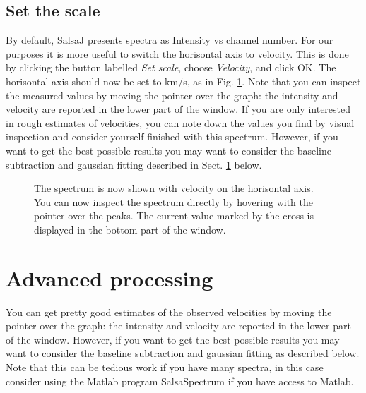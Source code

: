 \documentclass[11pt,a4paper]{article}
\begin{document}
\subsection{Set the scale}
By default, SalsaJ presents spectra as Intensity vs channel number. For our
purposes it is more useful to switch the horisontal axis to velocity. This is
done by clicking the button labelled \emph{Set scale}, choose \emph{Velocity},
and click OK. The horisontal axis should now be set to km/s, as in Fig.
\ref{fig:velocity}. Note that you can inspect the measured values by moving the
pointer over the graph: the intensity and velocity are reported in the lower part
of the window. If you are only interested in rough estimates of velocities,
you can note down the values you find by visual inspection and consider yourself finished
with this spectrum. However, if you want to get the best possible results you may 
want to consider the baseline subtraction and gaussian fitting described in Sect. 
\ref{sect:adv} below.
\begin{figure}[h!]
  \centering
  \caption{The spectrum is now shown with velocity on the horisontal axis. You can now
  inspect the spectrum directly by hovering with the pointer over the peaks. The current value
  marked by the cross is displayed in the bottom part of the window.}
  \label{fig:velocity}
\end{figure}

\section{Advanced processing}
\label{sect:adv}
You can get pretty good estimates of the observed velocities by moving the
pointer over the graph: the intensity and velocity are reported in the lower
part of the window.  However, if you want to get the best possible results you
may want to consider the baseline subtraction and gaussian fitting as described
below.  Note that this can be tedious work if you have many spectra, in this
case consider using the Matlab program SalsaSpectrum if you have access to
Matlab.
\end{document}
